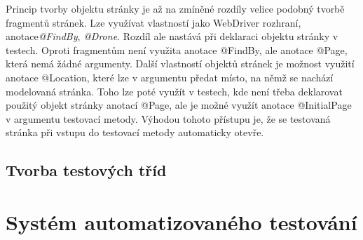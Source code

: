 \documentclass[
    color,   %
	table,   %
    twoside, %
]{fithesis3}
\begin{document}
Princip tvorby objektu stránky je až na zmíněné rozdíly velice podobný tvorbě fragmentů stránek. Lze využívat vlastností jako WebDriver rozhraní, anotace\emph{@FindBy}, \emph{@Drone}. Rozdíl ale nastává při deklaraci objektu stránky v testech. Oproti fragmentům není využita anotace @FindBy, ale anotace @Page, která nemá žádné argumenty. Další vlastností objektů stránek je možnost využití anotace @Location, které lze v argumentu předat místo, na němž se nachází modelovaná stránka. Toho lze poté využít v testech, kde není třeba deklarovat použitý objekt stránky anotací @Page, ale je možné využít anotace @InitialPage v argumentu testovací metody. Výhodou tohoto přístupu je, že se testovaná stránka při vstupu do testovací metody automaticky otevře.

\section{Tvorba testových tříd}

\chapter{Systém automatizovaného testování}
\end{document}
